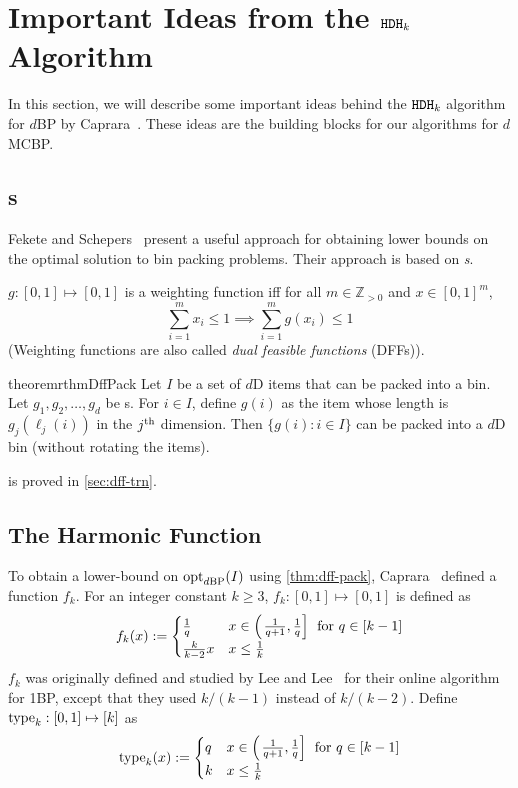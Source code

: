 \section{Important Ideas from the \texorpdfstring{$\operatorname{\mathtt{HDH}}_{k}$}{HDHk} Algorithm}
\label{sec:hdhk-prelims}

In this section, we will describe some important ideas behind the $\operatorname{\mathtt{HDH}}_{k}$ algorithm
for $d$BP by Caprara~\cite{caprara2008}.
These ideas are the building blocks for our algorithms for $d$MCBP.

\subsection{\DFF{}s}

Fekete and Schepers~\cite{fekete2004} present a useful approach for
obtaining lower bounds on the optimal solution to bin packing problems.
Their approach is based on \emph{\dff{}s}.

\begin{definition}
$g: [0, 1] \mapsto [0, 1]$ is a weighting function iff
for all $m \in \mathbb{Z}_{>0}$ and $x \in [0, 1]^m$,
\[ \sum_{i=1}^m x_i \le 1 \implies \sum_{i=1}^m g(x_i) \le 1 \]
(Weighting functions are also called \emph{dual feasible functions} (DFFs)).
\end{definition}

\begin{restatable}{theorem}{rthmDffPack}
\label{thm:dff-pack}
Let $I$ be a set of $d$D items that can be packed into a bin.
Let $g_1, g_2, \ldots, g_d$ be \dff{}s.
For $i \in I$, define $g(i)$ as the item whose length is $g_j(\ell_j(i))$ in the $j^{\textrm{th}}$ dimension.
Then $\{g(i): i \in I\}$ can be packed into a $d$D bin (without rotating the items).
\end{restatable}
 is proved in \cref{sec:dff-trn}.

\subsection{The Harmonic Function}
\label{sec:hdhk-prelims:harmonic}

To obtain a lower-bound on $\operatorname{opt}_{d\mathrm{BP}}(I)$ using \cref{thm:dff-pack},
Caprara~\cite{caprara2008} defined a function $f_k$.
For an integer constant $k \ge 3$, $f_k: [0, 1] \mapsto [0, 1]$ is defined as
\[ f_k(x) := \begin{cases}
\frac{1}{q} & x \in \left(\left.\frac{1}{q+1}, \frac{1}{q}\right]\right. \textrm{ for } q \in [k-1]
\\ \frac{k}{k-2}x & x \le \frac{1}{k} \end{cases} \]
$f_k$ was originally defined and studied by Lee and Lee~\cite{leelee} for their
online algorithm for 1BP, except that they used $k/(k-1)$ instead of $k/(k-2)$.
Define $\operatorname{type}_k: [0, 1] \mapsto [k]$ as
\[ \operatorname{type}_k(x) := \begin{cases}
q & x \in \left(\left.\frac{1}{q+1}, \frac{1}{q}\right]\right. \textrm{ for } q \in [k-1]
\\ k & x \le \frac{1}{k} \end{cases} \]

